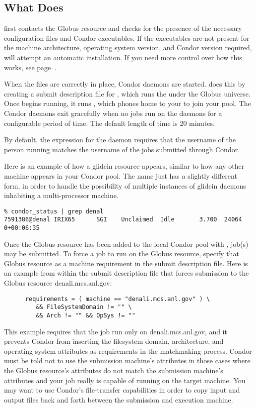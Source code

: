 \subsection{What  Does}

 first contacts the Globus resource and checks for the
presence of the necessary configuration files and Condor executables.
If the executables are not present for the machine architecture,
operating system version, and Condor version required,
 will attempt an automatic installation.  If you
need more control over how this works, see page~\pageref{man-condor-glidein}.

When the files are correctly in place,
Condor daemons are started.
 does this by creating a submit description file for
, which runs the  under the Globus
universe.
Once  begins running, it runs , which phones
home to your  to join your pool.
The Condor daemons exit gracefully when no jobs run on the daemons for a
configurable period of time. The default length of time is 20 minutes.

By default, the 
expression for the  daemon requires that the username
of the person running  matches the username of the jobs
submitted through Condor.

Here is an example of how a glidein resource appears, similar to how
any other machine appears in your Condor pool.  The name just has a
slightly different form, in order to handle the possibility of
multiple instances of glidein daemons inhabiting a multi-processor
machine.

\footnotesize
\begin{verbatim}
% condor_status | grep denal
7591386@denal IRIX65      SGI    Unclaimed  Idle       3.700  24064  0+00:06:35
\end{verbatim}
\normalsize

Once the Globus resource has been added to the local Condor
pool with ,
job(s) may be submitted.
To force a job to run on the Globus resource,
specify that Globus resource as a machine requirement
in the submit description file. 
Here is an example from within the submit description file
that forces submission to the Globus resource denali.mcs.anl.gov:
\begin{verbatim}
      requirements = ( machine == "denali.mcs.anl.gov" ) \
         && FileSystemDomain != "" \
         && Arch != "" && OpSys != ""
\end{verbatim}
This example requires that the job run only on denali.mcs.anl.gov,
and it prevents Condor from inserting the filesystem domain,
architecture, and operating system attributes as requirements
in the matchmaking process.
Condor must be told not to use the submission machine's
attributes in those cases
where the Globus resource's attributes
do not match the submission machine's attributes and your job
really is capable of running on the target machine.  You
may want to use Condor's file-transfer capabilities in order
to copy input and output files back and forth between the submission
and execution machine.
